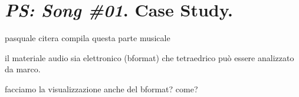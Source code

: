 \documentclass{article}
\begin{document}
\section{\emph{PS: Song \#01}. Case Study.}
\label{sec:ps01}

pasquale citera compila questa parte musicale

il materiale audio sia elettronico (bformat) che tetraedrico pu\`o essere analizzato da marco.

facciamo la visualizzazione anche del bformat? come?

%
%
\end{document}
